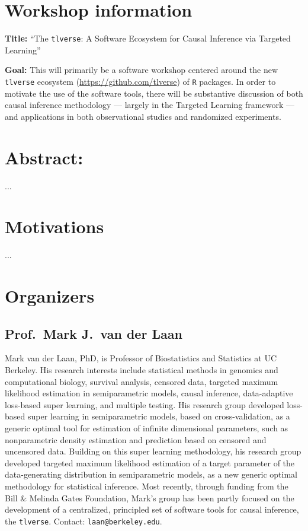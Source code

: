 \documentclass[a4paper,11pt]{texMemo}
\begin{document}
\maketitle

\section{Workshop information}

\textbf{Title:} ``The \texttt{tlverse}: A Software Ecosystem for Causal
Inference via Targeted Learning''

\textbf{Goal:} This will primarily be a software workshop centered around the
new \texttt{tlverse} ecosystem (\url{https://github.com/tlverse}) of \texttt{R}
packages. In order to motivate the use of the software tools, there will be
substantive discussion of both causal inference methodology --- largely in the
Targeted Learning framework --- and applications in both observational studies
and randomized experiments.

\section{Abstract:}

...

\section{Motivations}

...

\section{Organizers}

\subsection{Prof.~Mark J.~van der Laan}

Mark van der Laan, PhD, is Professor of Biostatistics and Statistics at UC
Berkeley. His research interests include statistical methods in genomics and
computational biology, survival analysis, censored data, targeted maximum
likelihood estimation in semiparametric models, causal inference, data-adaptive
loss-based super learning, and multiple testing. His research group developed
loss-based super learning in semiparametric models, based on cross-validation,
as a generic optimal tool for estimation of infinite dimensional parameters,
such as nonparametric density estimation and prediction based on censored and
uncensored data. Building on this super learning methodology, his research group
developed targeted maximum likelihood estimation of a target parameter of the
data-generating distribution in semiparametric models, as a new generic optimal
methodology for statistical inference. Most recently, through funding from the
Bill \& Melinda Gates Foundation, Mark's group has been partly focused on the
development of a centralized, principled set of software tools for causal
inference, the \texttt{tlverse}. Contact: \texttt{laan@berkeley.edu}.
\end{document}
